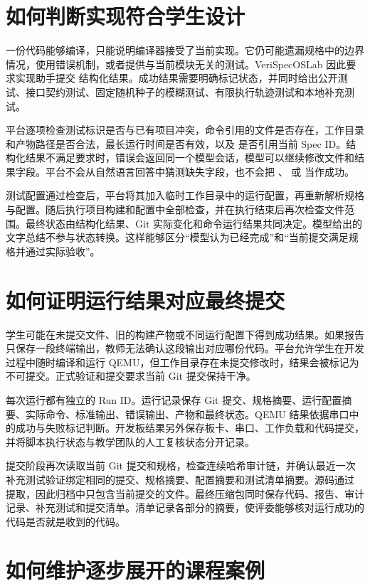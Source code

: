 \section{如何判断实现符合学生设计}

一份代码能够编译，只能说明编译器接受了当前实现。它仍可能遗漏规格中的边界情况，使用错误机制，或者提供与当前模块无关的测试。VeriSpecOSLab 因此要求实现助手提交  结构化结果。成功结果需要明确标记状态，并同时给出公开测试、接口契约测试、固定随机种子的模糊测试、有限执行轨迹测试和本地补充测试。

平台逐项检查测试标识是否与已有项目冲突，命令引用的文件是否存在，工作目录和产物路径是否合法，最长运行时间是否有效，以及  是否引用当前 Spec ID。结构化结果不满足要求时，错误会返回同一个模型会话，模型可以继续修改文件和结果字段。平台不会从自然语言回答中猜测缺失字段，也不会把 、 或  当作成功。

测试配置通过检查后，平台将其加入临时工作目录中的运行配置，再重新解析规格与配置。随后执行项目构建和配置中全部检查，并在执行结束后再次检查文件范围。最终状态由结构化结果、Git 实际变化和命令运行结果共同决定。模型给出的文字总结不参与状态转换。这样能够区分``模型认为已经完成''和``当前提交满足规格并通过实际验收''。

\section{如何证明运行结果对应最终提交}

学生可能在未提交文件、旧的构建产物或不同运行配置下得到成功结果。如果报告只保存一段终端输出，教师无法确认这段输出对应哪份代码。平台允许学生在开发过程中随时编译和运行 QEMU，但工作目录存在未提交修改时，结果会被标记为不可提交。正式验证和提交要求当前 Git 提交保持干净。

每次运行都有独立的 Run ID。运行记录保存 Git 提交、规格摘要、运行配置摘要、实际命令、标准输出、错误输出、产物和最终状态。QEMU 结果依据串口中的成功与失败标记判断。开发板结果另外保存板卡、串口、工作负载和代码提交，并将脚本执行状态与教学团队的人工复核状态分开记录。

提交阶段再次读取当前 Git 提交和规格，检查连续哈希审计链，并确认最近一次补充测试验证绑定相同的提交、规格摘要、配置摘要和测试清单摘要。源码通过  提取，因此归档中只包含当前提交的文件。最终压缩包同时保存代码、报告、审计记录、补充测试和提交清单。清单记录各部分的摘要，使评委能够核对运行成功的代码是否就是收到的代码。

\section{如何维护逐步展开的课程案例}

